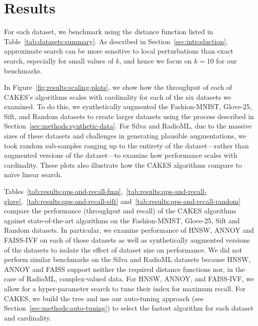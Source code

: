 \section{Results}
\label{sec:results}



For each dataset, we benchmark using the distance function listed in Table~\ref{tab:datasets:summary}. As described in Section~\ref{sec:introduction}, approximate search can be more sensitive to local perturbations than exact search, especially for small values of $k$, and hence we focus on $k=10$ for our benchmarks. 

In Figure~\ref{fig:results:scaling-plots}, we show how the throughput of each of CAKES's algorithms scales with cardinality for each of the six datasets we examined. To do this, we synthetically augmented the Fashion-MNIST, Glove-25, Sift, and Random datasets to create larger datasets using the process described in Section~\ref{sec:methods:synthetic-data}. For Silva and RadioML, due to the massive sizes of these datasets and challenges in generating plausible augmentations, we took random sub-samples ranging up to the entirety of the dataset---rather than augmented versions of the dataset---to examine how performance scales with cardinality. These plots also illustrate how the CAKES algorithms compare to na\"{i}ve linear search. 


Tables~\ref{tab:results:qps-and-recall-fmn},~\ref{tab:results:qps-and-recall-glove},~\ref{tab:results:qps-and-recall-sift} and~\ref{tab:results:qps-and-recall-random} compare the performance (throughput and recall) of the CAKES algorithms against state-of-the-art algorithms on the Fashion-MNIST, Glove-25, Sift and Random datasets. In particular, we examine performance of HNSW, ANNOY and FAISS-IVF on each of those datasets as well as synthetically augmented versions of the datasets to isolate the effect of dataset size on performance. We did not perform similar benchmarks on the Silva and RadioML datasets because HNSW, ANNOY and FAISS support neither the required distance functions nor, in the case of RadioML, complex-valued data. For HNSW, ANNOY, and FAISS-IVF, we allow for a hyper-parameter search to tune their index for maximum recall.
For CAKES, we build the tree and use our auto-tuning approach (see Section~\ref{sec:methods:auto-tuning}) to select the fastest algorithm for each dataset and cardinality.


